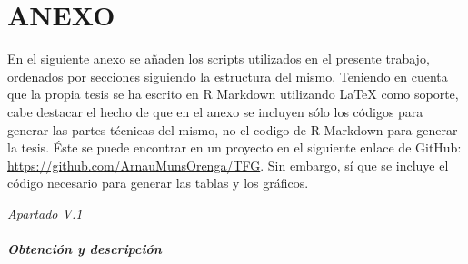 \documentclass[]{DissertateUSU}
\let\oldparagraph\paragraph
\renewcommand{\paragraph}[1]{\oldparagraph{#1}\mbox{}}
\begin{document}
\FloatBarrier
\newpage
{}
\fancyfoot[C]{\thepage}

\chapter{\textbf{\hspace{1pt} ANEXO}}
\setlength{\parindent}{1cm}
\setlength{\leftskip}{0.0in}

En el siguiente anexo se añaden los scripts utilizados en el presente
trabajo, ordenados por secciones siguiendo la estructura del mismo.
Teniendo en cuenta que la propia tesis se ha escrito en R Markdown
utilizando LaTeX como soporte, cabe destacar el hecho de que en el anexo
se incluyen sólo los códigos para generar las partes técnicas del mismo,
no el codigo de R Markdown para generar la tesis. Éste se puede
encontrar en un proyecto en el siguiente enlace de GitHub:
\url{https://github.com/ArnauMunsOrenga/TFG}. Sin embargo, sí que se
incluye el código necesario para generar las tablas y los gráficos.

\emph{Apartado V.1}

\setlength\parskip{5ex}

\hypertarget{obtencion-y-descripcion}{%
\paragraph{Obtención y descripción}\label{obtencion-y-descripcion}}

\scriptsize
\end{document}

